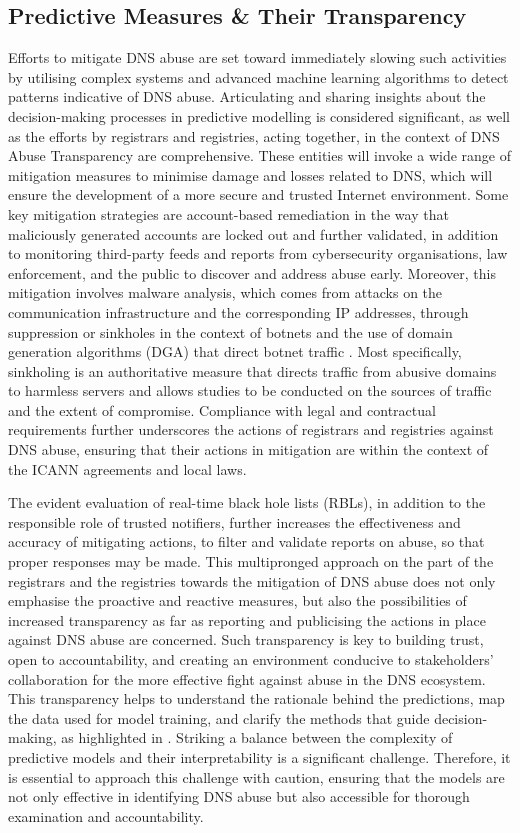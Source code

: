 \subsection{Predictive Measures \& Their Transparency}

Efforts to mitigate DNS abuse are set toward immediately slowing such activities by utilising complex systems and advanced machine learning algorithms to detect patterns indicative of DNS abuse. Articulating and sharing insights about the decision-making processes in predictive modelling is considered significant, as well as the efforts by registrars and registries, acting together, in the context of DNS Abuse Transparency are comprehensive. These entities will invoke a wide range of mitigation measures to minimise damage and losses related to DNS, which will ensure the development of a more secure and trusted Internet environment. Some key mitigation strategies are account-based remediation in the way that maliciously generated accounts are locked out and further validated, in addition to monitoring third-party feeds and reports from cybersecurity organisations, law enforcement, and the public to discover and address abuse early. Moreover, this mitigation involves malware analysis, which comes from attacks on the communication infrastructure and the corresponding IP addresses, through suppression or sinkholes in the context of botnets and the use of domain generation algorithms (DGA) that direct botnet traffic \cite{ M3AAWG2024}. Most specifically, sinkholing is an authoritative measure that directs traffic from abusive domains to harmless servers and allows studies to be conducted on the sources of traffic and the extent of compromise. Compliance with legal and contractual requirements further underscores the actions of registrars and registries against DNS abuse, ensuring that their actions in mitigation are within the context of the ICANN agreements and local laws. 

The evident evaluation of real-time black hole lists (RBLs), in addition to the responsible role of trusted notifiers, further increases the effectiveness and accuracy of mitigating actions, to filter and validate reports on abuse, so that proper responses may be made. This multipronged approach on the part of the registrars and the registries towards the mitigation of DNS abuse does not only emphasise the proactive and reactive measures, but also the possibilities of increased transparency as far as reporting and publicising the actions in place against DNS abuse are concerned. Such transparency is key to building trust, open to accountability, and creating an environment conducive to stakeholders' collaboration for the more effective fight against abuse in the DNS ecosystem. This transparency helps to understand the rationale behind the predictions, map the data used for model training, and clarify the methods that guide decision-making, as highlighted in \cite{hussain2022software}. Striking a balance between the complexity of predictive models and their interpretability is a significant challenge. Therefore, it is essential to approach this challenge with caution, ensuring that the models are not only effective in identifying DNS abuse but also accessible for thorough examination and accountability.



